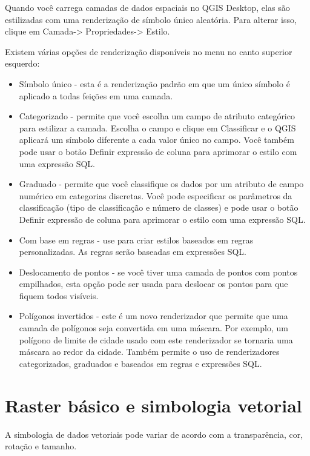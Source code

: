 \documentclass[
]{krantz}
\providecommand{\tightlist}{%
  \setlength{\itemsep}{0pt}\setlength{\parskip}{0pt}}
\begin{document}
Quando você carrega camadas de dados espaciais no QGIS Desktop, elas são estilizadas com uma renderização de símbolo único aleatória. Para alterar isso, clique em Camada-\textgreater{} Propriedades-\textgreater{} Estilo.

Existem várias opções de renderização disponíveis no menu no canto superior esquerdo:

\begin{itemize}
\tightlist
\item
  Símbolo único - esta é a renderização padrão em que um único símbolo é aplicado a todas feições em uma camada.
\item
  Categorizado - permite que você escolha um campo de atributo categórico para estilizar a camada. Escolha o campo e clique em Classificar e o QGIS aplicará um símbolo diferente a cada valor único no campo. Você também pode usar o botão Definir expressão de coluna para aprimorar o estilo com uma expressão SQL.
\item
  Graduado - permite que você classifique os dados por um atributo de campo numérico em categorias discretas. Você pode especificar os parâmetros da classificação (tipo de classificação e número de classes) e pode usar o botão Definir expressão de coluna para aprimorar o estilo com uma expressão SQL.
\item
  Com base em regras - use para criar estilos baseados em regras personalizadas. As regras serão baseadas em expressões SQL.
\item
  Deslocamento de pontos - se você tiver uma camada de pontos com pontos empilhados, esta opção pode ser usada para deslocar os pontos para que fiquem todos visíveis.
\item
  Polígonos invertidos - este é um novo renderizador que permite que uma camada de polígonos seja convertida em uma máscara. Por exemplo, um polígono de limite de cidade usado com este renderizador se tornaria uma máscara ao redor da cidade. Também permite o uso de renderizadores categorizados, graduados e baseados em regras e expressões SQL.
\end{itemize}

\hypertarget{raster-buxe1sico-e-simbologia-vetorial}{%
\section{Raster básico e simbologia vetorial}\label{raster-buxe1sico-e-simbologia-vetorial}}

A simbologia de dados vetoriais pode variar de acordo com a transparência, cor, rotação e tamanho.
\end{document}
